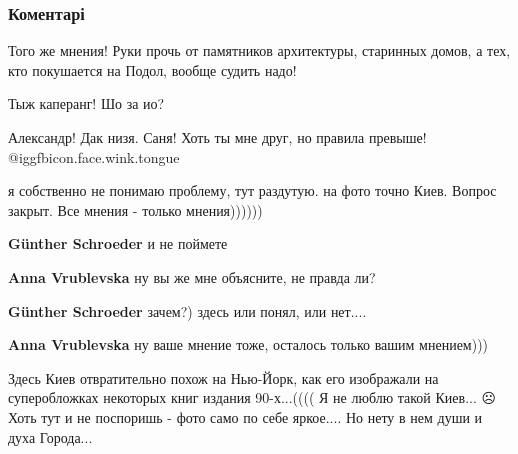  
 
 
 
 
\subsubsection{Коментарі}

\begin{itemize} %
Того же мнения! Руки прочь от памятников архитектуры, старинных домов, а тех, кто покушается на Подол, вообще судить надо!

Тыж каперанг! Шо за ио?

\begin{itemize} %
Александр! Дак низя. Саня! Хоть ты мне друг, но правила превыше! @igg{fbicon.face.wink.tongue} 
\end{itemize} %


я собственно не понимаю проблему, тут раздутую. на фото точно Киев. Вопрос
закрыт. Все мнения - только мнения))))))

\begin{itemize} %
\textbf{Günther Schroeder} и не поймете

\begin{itemize} %
\textbf{Anna Vrublevska} ну вы же мне объясните, не правда ли?

\textbf{Günther Schroeder} зачем?) здесь или понял, или нет....

\textbf{Anna Vrublevska} ну ваше мнение тоже, осталось только вашим мнением)))
\end{itemize} %

\end{itemize} %


Здесь Киев отвратительно похож на Нью-Йорк, как его изображали на суперобложках
некоторых книг издания 90-х...(((( Я не люблю такой Киев... ☹️ Хоть тут и не
поспоришь - фото само по себе яркое.... Но нету в нем души и духа Города...


\end{itemize}
